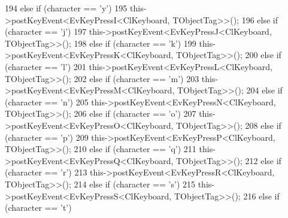 \begin{DoxyCode}
{194                         \textcolor{keywordflow}{else} \textcolor{keywordflow}{if} (character == \textcolor{charliteral}{'y'})
195                                 this->postKeyEvent<EvKeyPressI<ClKeyboard, TObjectTag>>();
196                         \textcolor{keywordflow}{else} \textcolor{keywordflow}{if} (character == \textcolor{charliteral}{'j'})
197                                 this->postKeyEvent<EvKeyPressJ<ClKeyboard, TObjectTag>>();
198                         \textcolor{keywordflow}{else} \textcolor{keywordflow}{if} (character == \textcolor{charliteral}{'k'})
199                                 this->postKeyEvent<EvKeyPressK<ClKeyboard, TObjectTag>>();
200                         \textcolor{keywordflow}{else} \textcolor{keywordflow}{if} (character == \textcolor{charliteral}{'l'})
201                                 this->postKeyEvent<EvKeyPressL<ClKeyboard, TObjectTag>>();
202                         \textcolor{keywordflow}{else} \textcolor{keywordflow}{if} (character == \textcolor{charliteral}{'m'})
203                                 this->postKeyEvent<EvKeyPressM<ClKeyboard, TObjectTag>>();
204                         \textcolor{keywordflow}{else} \textcolor{keywordflow}{if} (character == \textcolor{charliteral}{'n'})
205                                 this->postKeyEvent<EvKeyPressN<ClKeyboard, TObjectTag>>();
206                         \textcolor{keywordflow}{else} \textcolor{keywordflow}{if} (character == \textcolor{charliteral}{'o'})
207                                 this->postKeyEvent<EvKeyPressO<ClKeyboard, TObjectTag>>();
208                         \textcolor{keywordflow}{else} \textcolor{keywordflow}{if} (character == \textcolor{charliteral}{'p'})
209                                 this->postKeyEvent<EvKeyPressP<ClKeyboard, TObjectTag>>();
210                         \textcolor{keywordflow}{else} \textcolor{keywordflow}{if} (character == \textcolor{charliteral}{'q'})
211                                 this->postKeyEvent<EvKeyPressQ<ClKeyboard, TObjectTag>>();
212                         \textcolor{keywordflow}{else} \textcolor{keywordflow}{if} (character == \textcolor{charliteral}{'r'})
213                                 this->postKeyEvent<EvKeyPressR<ClKeyboard, TObjectTag>>();
214                         \textcolor{keywordflow}{else} \textcolor{keywordflow}{if} (character == \textcolor{charliteral}{'s'})
215                                 this->postKeyEvent<EvKeyPressS<ClKeyboard, TObjectTag>>();
216                         \textcolor{keywordflow}{else} \textcolor{keywordflow}{if} (character == \textcolor{charliteral}{'t'})
}
\end{DoxyCode}
